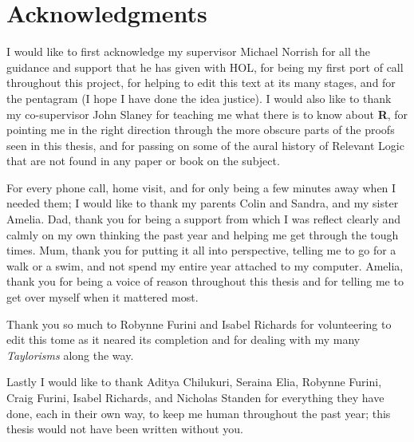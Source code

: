 \chapter*{Acknowledgments}
 
I would like to first acknowledge my supervisor Michael Norrish for all the guidance and support that he has given with HOL, for being my first port of call throughout this project, for helping to edit this text at its many stages, and for the pentagram (I hope I have done the idea justice). I would also like to thank my co-supervisor John Slaney for teaching me what there is to know about \textbf{R}, for pointing me in the right direction through the more obscure parts of the proofs seen in this thesis, and for passing on some of the aural history of Relevant Logic that are not found in any paper or book on the subject. 

For every phone call, home visit, and for only being a few minutes away when I needed them; I would like to thank my parents Colin and Sandra, and my sister Amelia. 
Dad, thank you for being a support from which I was reflect clearly and calmly on my own thinking the past year and helping me get through the tough times. 
Mum, thank you for putting it all into perspective, telling me to go for a walk or a swim, and not spend my entire year attached to my computer. 
Amelia, thank you for being a voice of reason throughout this thesis and for telling me to get over myself when it mattered most.  

Thank you so much to Robynne Furini and Isabel Richards for volunteering to edit this tome as it neared its completion and for dealing with my many \emph{Taylorisms} along the way.   

Lastly I would like to thank Aditya Chilukuri, Seraina Elia, Robynne Furini, Craig Furini, Isabel Richards, and Nicholas Standen for everything they have done, each in their own way, to keep me human throughout the past year; this thesis would not have been written without you.   
